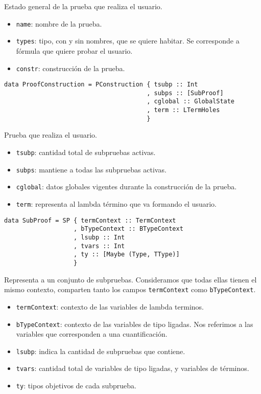 \documentclass[a4paper,11pt]{article}
\begin{document}
Estado general de la prueba que realiza el usuario.
\begin{itemize}
  \item \texttt{name}: nombre de la prueba.
  \item \texttt{types}: tipo, con y sin nombres, que se quiere habitar. Se corresponde a fórmula que quiere probar el usuario.
  \item \texttt{constr}: construcción de la prueba.
\end{itemize}

\begin{verbatim}
data ProofConstruction = PConstruction { tsubp :: Int
                                       , subps :: [SubProof]
                                       , cglobal :: GlobalState
                                       , term :: LTermHoles
                                       }
\end{verbatim}

Prueba que realiza el usuario.
\begin{itemize}
  \item \texttt{tsubp}: cantidad total de subpruebas activas.
  \item \texttt{subps}: mantiene a todas las subpruebas activas.
  \item \texttt{cglobal}: datos globales vigentes durante la construcción de la prueba.
  \item \texttt{term}: representa al lambda término que va formando el usuario.
\end{itemize}

\begin{verbatim}
data SubProof = SP { termContext :: TermContext
                   , bTypeContext :: BTypeContext
                   , lsubp :: Int
                   , tvars :: Int
                   , ty :: [Maybe (Type, TType)]
                   }
\end{verbatim}

Representa a un conjunto de subpruebas.
Consideramos que todas ellas tienen el mismo contexto, comparten tanto los campos \texttt{termContext} como \texttt{bTypeContext}.
\begin{itemize}
  \item \texttt{termContext}: contexto de las variables de lambda terminos.
  \item \texttt{bTypeContext}: contexto de las variables de tipo ligadas. Nos referimos a las variables que corresponden a una cuantificación.
  \item \texttt{lsubp}: indica la cantidad de subpruebas que contiene.
  \item \texttt{tvars}: cantidad total de variables de tipo ligadas, y variables de términos.
  \item \texttt{ty}: tipos objetivos de cada subprueba.
\end{itemize}
\end{document}
